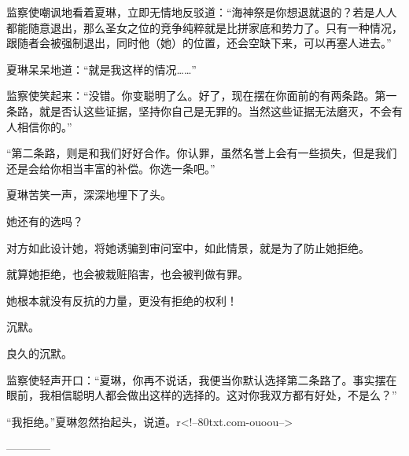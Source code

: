 \begin{this_body}
监察使嘲讽地看着夏琳，立即无情地反驳道：“海神祭是你想退就退的？若是人人都能随意退出，那么圣女之位的竞争纯粹就是比拼家底和势力了。只有一种情况，跟随者会被强制退出，同时他（她）的位置，还会空缺下来，可以再塞人进去。”

夏琳呆呆地道：“就是我这样的情况……”

监察使笑起来：“没错。你变聪明了么。好了，现在摆在你面前的有两条路。第一条路，就是否认这些证据，坚持你自己是无罪的。当然这些证据无法磨灭，不会有人相信你的。”

“第二条路，则是和我们好好合作。你认罪，虽然名誉上会有一些损失，但是我们还是会给你相当丰富的补偿。你选一条吧。”

夏琳苦笑一声，深深地埋下了头。

她还有的选吗？

对方如此设计她，将她诱骗到审问室中，如此情景，就是为了防止她拒绝。

就算她拒绝，也会被栽赃陷害，也会被判做有罪。

她根本就没有反抗的力量，更没有拒绝的权利！

沉默。

良久的沉默。

监察使轻声开口：“夏琳，你再不说话，我便当你默认选择第二条路了。事实摆在眼前，我相信聪明人都会做出这样的选择的。这对你我双方都有好处，不是么？”

“我拒绝。”夏琳忽然抬起头，说道。r<!--80txt.com-ouoou-->

------------

\end{this_body}

